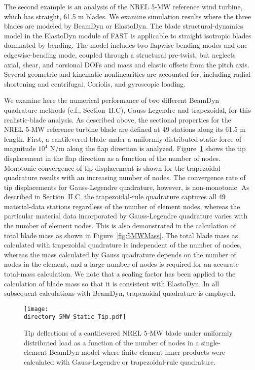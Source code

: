 \documentclass{aiaa-tc}
\def\directory{EPSF/}
\begin{document}
The second example is an analysis of the NREL 5-MW reference wind turbine\cite{Jonkman-etal:2009}, which has straight, 61.5 m blades.  
We examine simulation results where the three blades are modeled by BeamDyn or ElastoDyn.
The blade structural-dynamics model in the ElastoDyn module of FAST is applicable to straight isotropic blades dominated by bending.  The model includes two flapwise-bending modes and one edgewise-bending mode, coupled through a structural pre-twist, but neglects axial, shear, and torsional DOFs and mass and elastic offsets from the pitch axis.  Several geometric and kinematic nonlinearities are accounted for, including radial shortening and centrifugal, Coriolis, and gyroscopic loading.

We examine here the numerical performance of two different BeamDyn quadrature methods (c.f., Section~II.C), Gauss-Legendre and trapezoidal, for this realistic-blade analysis.  
As described above, the sectional properties for the NREL 5-MW reference turbine blade are defined at 49 stations along its 61.5 m length.  
First, a cantilevered blade under a uniformly distributed static force of magnitude $10^4$ N/m along the flap direction is analyzed.
Figure~\ref{fig:5MWStaticTip} shows the tip displacement in the flap direction as a function of the number of nodes.  
Monotonic convergence of tip-displacement is shown for the trapezoidal-quadrature results with an increasing number of nodes.  
The convergence rate of tip displacements for Gauss-Legendre quadrature, however, is non-monotonic.  As described in Section~II.C, the trapezoidal-rule quadrature captures all 49 material-data stations regardless of the number of element nodes, whereas the particular material data incorporated by Gauss-Legendre quadrature varies with the number of element nodes.  
This is also demonstrated in the calculation of total blade mass as shown in Figure~\ref{fig:5MWMass}.  
The total blade mass as calculated with trapezoidal quadrature is independent of the number of nodes, whereas the mass calculated by Gauss quadrature  depends on the number of nodes in the
element, and a large number of nodes is required for an accurate total-mass
calculation.  
We note that a scaling factor has been applied to the calculation of blade mass so that it is consistent with ElastoDyn.  
In all subsequent calculations with BeamDyn, trapezoidal quadrature is employed. 
\begin{figure}
\centering
\texttt{[image: \\directory 5MW\_Static\_Tip.pdf]}
\caption{Tip deflections of a cantilevered NREL 5-MW blade under uniformly distributed load as a function of the number of nodes in a single-element BeamDyn model where finite-element inner-products were calculated with Gauss-Legendre or trapezoidal-rule quadrature.} 
\label{fig:5MWStaticTip}
\end{figure}
\end{document}
